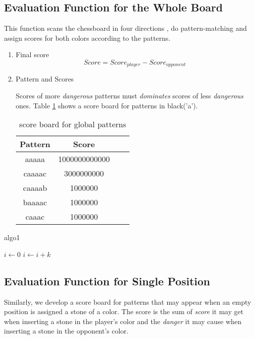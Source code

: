 \documentclass[conference]{IEEEtran}
\begin{document}
\subsection{Evaluation Function for the Whole Board}
This function scans the chessboard in four directions , do pattern-matching and assign scores for both colors according to the patterns. 
\begin{enumerate}
	\item Final score 
	$$ Score = Score_{player} - Score_{opponent}$$
	\item Pattern and Scores
	
	Scores of more \emph{dangerous} patterns must \emph{dominates} scores of less \emph{dangerous} ones. Table \ref{table:1} shows a score board for patterns in black('a').

	\begin{table}[htb]
	\caption{score board for global patterns}
	\centering
    \begin{tabular}{cccc}
    \toprule
    Pattern&Score\\
    \midrule
	aaaaa&1000000000000\\
	caaaac&3000000000\\
	caaaab&1000000\\
	baaaac&1000000\\
	caaac&1000000\\
	\bottomrule
	\end{tabular}
	\label{table:1}
	\end{table}
\end{enumerate}

\begin{algorithm}
    \caption{algo1}
\begin{algorithmic}
        \State $i\gets 0$
    \Else
            \State $i\gets i+k$
        \EndIf
    \EndIf
    \end{algorithmic}
\end{algorithm}
\subsection{Evaluation Function for Single Position}
Similarly, we develop a score board for patterns that may appear when an empty position is assigned a stone of a color. The score is the sum of \emph{score} it may get when inserting a stone in the player's color and the \emph{danger} it may cause when inserting a stone in the opponent's color.
\end{document}
